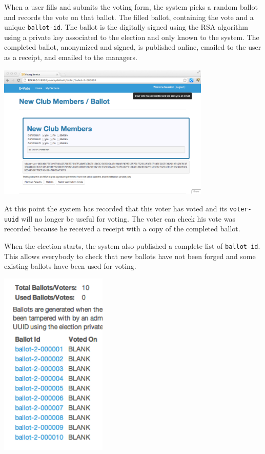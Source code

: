 \documentclass[12pt]{article}
\begin{document}
When a user fills and submits the voting form, the system picks a random ballot and records the vote on that ballot. The filled ballot, containing the vote and a unique {\tt ballot-id}. The ballot is the digitally signed using the RSA algorithm using a private key associated to the election and only known to the system. The completed ballot, anonymized and signed, is published online, emailed to the user as a receipt, and emailed to the managers.

\begin{center}
\includegraphics[width=4in]{images/ballot.png}
\end{center}
At this point the system has recorded that this voter has voted and its {\tt voter-uuid} will no longer be useful for voting. The voter can check his vote was recorded because he received a receipt with a copy of the completed ballot.

When the election starts, the system also published a complete list of {\tt ballot-id}. This allows everybody to check that new ballots have not been forged and some existing ballots have been used for voting.

\begin{center}
\includegraphics[width=2in]{images/ballots.png}
\end{center}
\end{document}
